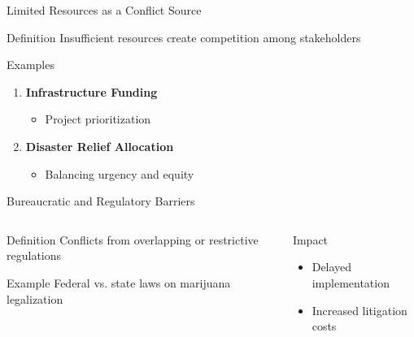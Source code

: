 \documentclass[10pt]{beamer}
\begin{document}
\begin{frame}{Limited Resources as a Conflict Source}
    \begin{block}{Definition}
        Insufficient resources create competition among stakeholders
    \end{block}
    
    \begin{exampleblock}{Examples}
        \begin{enumerate}
            \item \textbf{Infrastructure Funding}
            \begin{itemize}
                \item Project prioritization
            \end{itemize}
            
            \item \textbf{Disaster Relief Allocation}
            \begin{itemize}
                \item Balancing urgency and equity
            \end{itemize}
        \end{enumerate}
    \end{exampleblock}
\end{frame}

\begin{frame}{Bureaucratic and Regulatory Barriers}
    \begin{columns}[T]
        \begin{column}{0.6\textwidth}
            \begin{block}{Definition}
                Conflicts from overlapping or restrictive regulations
            \end{block}
            
            \begin{exampleblock}{Example}
                Federal vs. state laws on marijuana legalization
            \end{exampleblock}
        \end{column}
        \begin{column}{0.4\textwidth}
            \begin{alertblock}{Impact}
                \begin{itemize}
                    \item Delayed implementation
                    \item Increased litigation costs
                \end{itemize}
            \end{alertblock}
        \end{column}
    \end{columns}
\end{frame}
\end{document}
